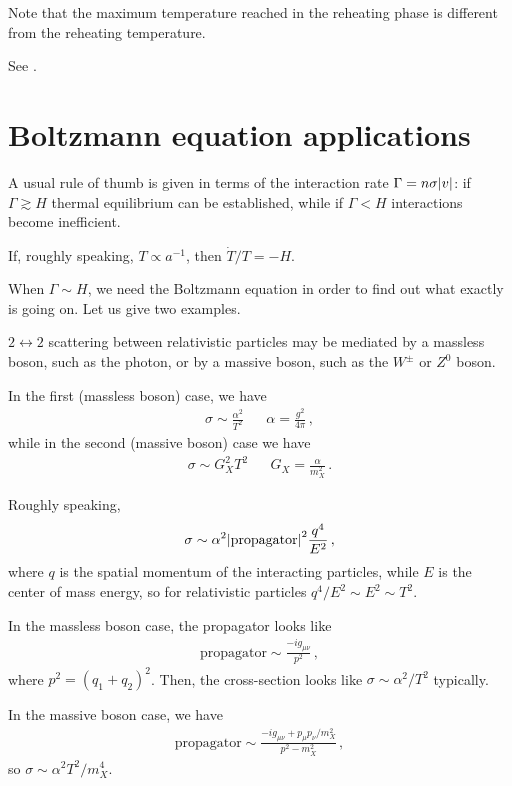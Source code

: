 \documentclass[main.tex]{subfiles}
\begin{document}
Note that the maximum temperature reached in the reheating phase is different from the reheating temperature. 

See \cite[fig.\ 8.3]{kolbEarlyUniverse1994}. 

\section{Boltzmann equation applications}

A usual rule of thumb is given in terms of the interaction rate \(\Gamma = n \sigma \abs{v}\): if \(\Gamma \gtrsim H\) thermal equilibrium can be established, while if \(\Gamma < H\) interactions become inefficient. 

If, roughly speaking, \(T \propto a^{-1}\), then \(\dot{T} / T = - H\). 

When \(\Gamma \sim H\), we need the Boltzmann equation in order to find out what exactly is going on. 
Let us give two examples. 

\(2 \leftrightarrow 2\) scattering between relativistic particles may be mediated by a massless boson, such as the photon, or by a massive boson, such as the \(W^{\pm}\) or \(Z^{0}\) boson. 

In the first (massless boson) case, we have 
%
\begin{align}
\sigma \sim \frac{\alpha^2}{T^2} && \alpha = \frac{g^2}{4 \pi }
\,,
\end{align}
%
while in the second (massive boson) case we have 
%
\begin{align}
\sigma \sim G_X^2 T^2 && G_X = \frac{\alpha }{m_X^2}
\,.
\end{align}

Roughly speaking, 
%
\begin{align}
\sigma \sim \alpha^2\abs{\text{propagator}}^2 \frac{q^{4}}{E^2}
\,,
\end{align}
%
where \(q\) is the spatial momentum of the interacting particles, while \(E\) is the center of mass energy, so for relativistic particles \(q^{4}/ E^2 \sim E^2 \sim T^2\).

In the massless boson case, the propagator looks like 
%
\begin{align}
\text{propagator} \sim \frac{-i g_{\mu \nu }}{p^2}
\,,
\end{align}
%
where \(p^2 =(q_1 + q_2 )^2\). 
Then, the cross-section looks like \(\sigma \sim \alpha^2 / T^2\) typically. 

In the massive boson case, we have 
%
\begin{align}
\text{propagator} \sim \frac{- i g_{\mu \nu } + p_{\mu } p_{\nu } / m_X^2}{p^2-  m_X^2}
\,,
\end{align}
%
so \(\sigma \sim \alpha^2 T^2 / m_X^{4}\). 
\end{document}
